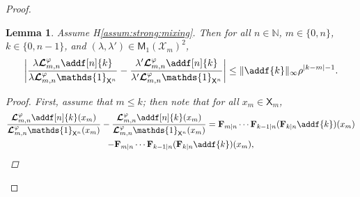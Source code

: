 \documentclass{article}
\newtheorem{lemma}[theorem]{Lemma}
\newcommand{\fk}[2]{\mathbf{F}_{#1 | #2}}
\newcommand{\probmeas}[1]{\mathsf{M}_1(#1)}
\newcommand{\Xfd}{\mathcal{X}}
\newcommand{\precpar}{\varphi}
\newcommand{\intvect}[2]{\{ #1, #2 \}}
\newcommand{\nset}{\mathbb{N}}
\newcommand{\1}{\mathbbm{1}}
\newcommand{\retrokmod}{\boldsymbol{\mathcal{L}}^\precpar}
\newcommand{\Xset}{\mathsf{X}}
\def\1{\mathds{1}}
\begin{document}
\begin{proof}
\begin{lemma} \label{lem:geo:bound}
Assume H\ref{assum:strong:mixing}. Then for all $n \in \nset$, $m \in \intvect{0}{n}$, $k \in \intvect{0}{n - 1}$, and $(\lambda, \lambda') \in \probmeas{\Xfd_m}^2$, 
$$
\left|\frac{\lambda \retrokmod_{m, n} \addf[n]{k}}{\lambda \retrokmod_{m, n} \1_{\Xset^n}} - \frac{\lambda' \retrokmod_{m, n} \addf[n]{k}}{\lambda' \retrokmod_{m, n} \1_{\Xset^n}} \right| \leq \| \addf{k} \|_\infty \rho^{|k - m| - 1}. 
$$
\begin{proof}
First, assume that $m \leq k$; then note that for all $x_m \in \Xset_m$, 
\begin{multline} \label{eq:retrokmodnorm:vs:forward:kernel}
\frac{\retrokmod_{m, n} \addf[n]{k}(x_m)}{\retrokmod_{m, n} \1_{\Xset^n}(x_m)} - \frac{\retrokmod_{m, n} \addf[n]{k}(x_m)}{\retrokmod_{m, n} \1_{\Xset^n}(x_m)}
 = \fk{m}{n} \cdots \fk{k - 1}{n} (\fk{k}{n} \addf{k})(x_m) \\ 
- \fk{m}{n} \cdots \fk{k - 1}{n} (\fk{k}{n} \addf{k})(x_m),    
\end{multline}


\end{proof}
\end{lemma}
\end{proof}
\end{document}

